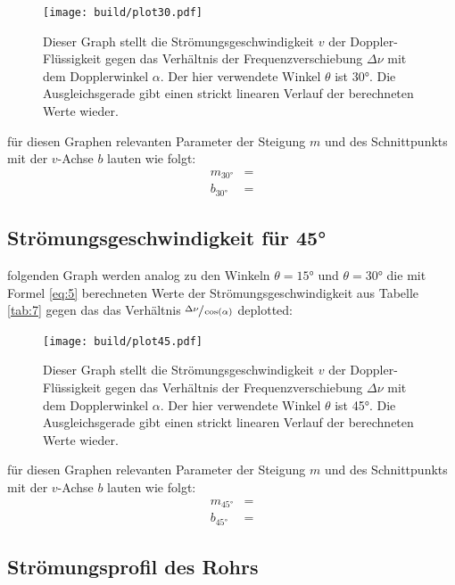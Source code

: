 \begin{figure}[H]
    \centering
    \texttt{[image: build/plot30.pdf]}
    \caption{Dieser Graph stellt die Strömungsgeschwindigkeit $v$ der Doppler-Flüssigkeit gegen das Verhältnis der Frequenzverschiebung $\Delta\nu$ mit dem Dopplerwinkel $\alpha$. 
    Der hier verwendete Winkel $\theta$ ist 30°. Die Ausgleichsgerade gibt einen strickt linearen Verlauf der berechneten Werte wieder.}
    \label{fig:6}
\end{figure}

    \justifying für diesen Graphen relevanten Parameter der Steigung $m$ und des Schnittpunkts mit der $v$-Achse $b$ lauten wie folgt:
    \begin{align}
        m_{30°} &= \text{} \label{eq:9}\\
        b_{30°} &= \text{} \label{eq:10}
    \end{align}

\newpage
\subsection{Strömungsgeschwindigkeit für 45°}

    \justifying folgenden Graph werden analog zu den Winkeln $\theta=15°$ und $\theta=30°$ die mit Formel \eqref{eq:5} berechneten Werte der Strömungsgeschwindigkeit 
    aus Tabelle \ref{tab:7} gegen das das Verhältnis $\sfrac{\Delta\nu}{\cos(\alpha)}$ deplotted:

\begin{figure}[H]
    \centering
    \texttt{[image: build/plot45.pdf]}
    \caption{Dieser Graph stellt die Strömungsgeschwindigkeit $v$ der Doppler-Flüssigkeit gegen das Verhältnis der Frequenzverschiebung $\Delta\nu$ mit dem Dopplerwinkel $\alpha$. 
    Der hier verwendete Winkel $\theta$ ist 45°. Die Ausgleichsgerade gibt einen strickt linearen Verlauf der berechneten Werte wieder.}
    \label{fig:7}
\end{figure}

    \justifying für diesen Graphen relevanten Parameter der Steigung $m$ und des Schnittpunkts mit der $v$-Achse $b$ lauten wie folgt:
    \begin{align}
        m_{45°} &= \text{} \label{eq:11}\\
        b_{45°} &= \text{} \label{eq:12}
    \end{align}

\newpage
\subsection{Strömungsprofil des Rohrs}

